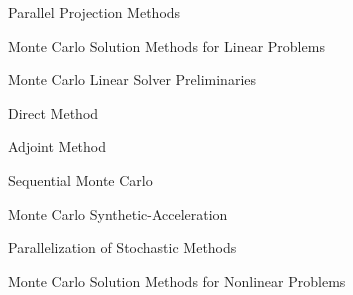 \documentclass{beamer}
\begin{document}
\begin{frame}{Parallel Projection Methods}

\end{frame}

\begin{frame}{Monte Carlo Solution Methods for Linear Problems}

\end{frame}

\begin{frame}{Monte Carlo Linear Solver Preliminaries}

\end{frame}

\begin{frame}{Direct Method}

\end{frame}

\begin{frame}{Adjoint Method}

\end{frame}

\begin{frame}{Sequential Monte Carlo}

\end{frame}

\begin{frame}{Monte Carlo Synthetic-Acceleration}

\end{frame}

\begin{frame}{Parallelization of Stochastic Methods}

\end{frame}

\begin{frame}{Monte Carlo Solution Methods for Nonlinear Problems}

\end{frame}
\end{document}
